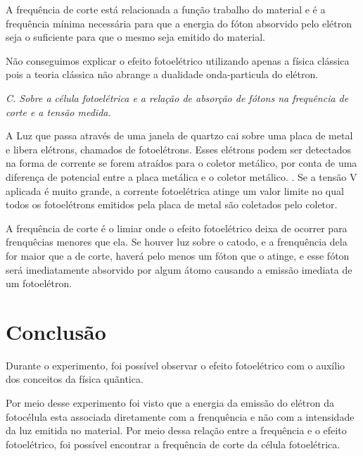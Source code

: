 \documentclass[10pt,twocolumn,letterpaper]{article}
\begin{document}
\hspace{1cm} A frequência de corte está relacionada a função trabalho do material e é a frequência mínima necessária para que a energia do fóton absorvido pelo elétron seja o suficiente para que o mesmo seja emitido do material.

\hspace{1cm} Não conseguimos explicar o efeito fotoelétrico utilizando apenas a física clássica pois a teoria clássica não abrange a dualidade onda-particula do elétron.

\noindent\textit{C. Sobre a célula fotoelétrica e a relação de absorção de
fótons na frequência de corte e a tensão medida.}

\hspace{1cm} A Luz que passa através de uma janela de quartzo cai sobre uma placa de metal e libera elétrons, chamados de fotoelétrons. Esses elétrons podem ser detectados na forma de corrente se forem atraídos para o coletor metálico, por conta de uma diferença de potencial entre a placa metálica e o coletor metálico. . Se a tensão V aplicada é muito grande, a corrente fotoelétrica atinge um valor limite no qual todos os fotoelétrons emitidos pela placa de metal são coletados pelo coletor.

\hspace{1cm} A frequência de corte é o limiar onde o efeito fotoelétrico deixa de ocorrer para frenquêcias menores que ela. Se houver luz sobre o catodo, e a frenquência dela for maior que a de corte, haverá pelo menos um fóton que o atinge, e esse fóton será imediatamente absorvido por algum átomo causando a emissão imediata de um fotoelétron.


\section{Conclusão}

\hspace{1cm} Durante o experimento, foi possível observar o efeito fotoelétrico com o auxílio dos conceitos da física quãntica.

\hspace{1cm} Por meio desse experimento foi visto que a energia da emissão do elétron da fotocélula esta associada diretamente com a frenquência e não com a intensidade da luz emitida no material. Por meio dessa relação entre a frequência e o efeito fotoelétrico, foi possível encontrar a frequência de corte da célula fotoelétrica.
\end{document}
